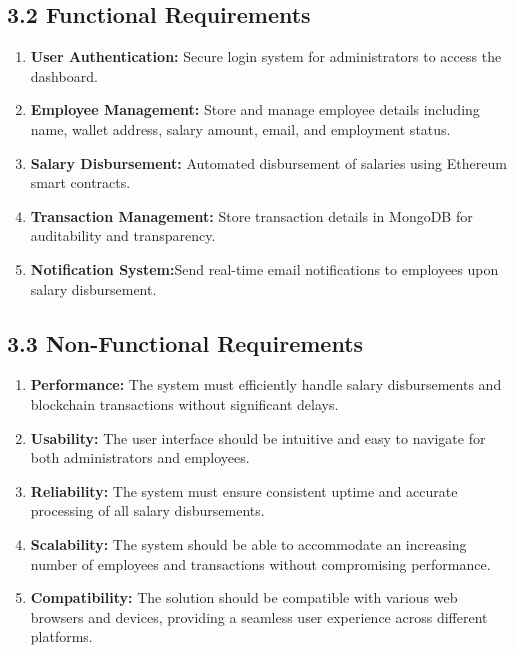 \documentclass[12pt]{report}
\begin{document}
\subsection*{3.2 Functional Requirements}
\begin{center}    
    \justify 
\begin{enumerate}
    \item \textbf{User Authentication:} Secure login system for administrators to access the dashboard.
    \item \textbf{Employee Management:} Store and manage employee details including name, wallet address, salary amount, email, and employment status.
    \item \textbf{Salary Disbursement:} Automated disbursement of salaries using Ethereum smart contracts.
    \item \textbf{Transaction Management:} Store transaction details in MongoDB for auditability and transparency.
    \item \textbf{Notification System:}Send real-time email notifications to employees upon salary disbursement.
\end{enumerate}
\end{center}
\vspace{0.7em}
\subsection*{3.3 Non-Functional Requirements}
\begin{center}    
    \justify 
\begin{enumerate}
    \item \textbf{Performance:} The system must efficiently handle salary disbursements and blockchain transactions without significant delays.
    \item \textbf{Usability:} The user interface should be intuitive and easy to navigate for both administrators and employees.
    \item \textbf{Reliability:} The system must ensure consistent uptime and accurate processing of all salary disbursements.
    \item \textbf{Scalability:} The system should be able to accommodate an increasing number of employees and transactions without compromising performance.
    \item \textbf{Compatibility:} The solution should be compatible with various web browsers and devices, providing a seamless user experience across different platforms.
\end{enumerate}
\end{center}
\vspace{0.7em}
\end{document}
